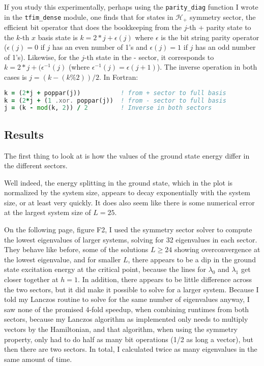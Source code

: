 \documentclass{article}
\begin{document}
If you study this experimentally, perhaps using the {\tt parity\_diag} function
I wrote in the {\tt tfim\_dense} module, one finds that for states in $\mathcal H_+$
symmetry sector, the efficient bit operator that does the bookkeeping from the $j$-th
+ parity state to the $k$-th $x$ basis state is $k = 2*j + \epsilon(j)$ where $\epsilon$
is the bit string parity operator ($\epsilon(j) = 0$ if $j$ has an even number of 1's
and $\epsilon(j) = 1$ if $j$ has an odd number of 1's).
Likewise, for the $j$-th state in the - sector, it corresponds to $k = 2*j + (\epsilon^{-1}(j)$
(where $\epsilon^{-1}(j) = \epsilon(j+1)$).
The inverse operation in both cases is $j = (k - (k \% 2)) / 2$.
In Fortran:
\begin{lstlisting}[language=Fortran]
k = (2*j + poppar(j))           ! from + sector to full basis
k = (2*j + (1 .xor. poppar(j))  ! from - sector to full basis
j = (k - mod(k, 2)) / 2         ! Inverse in both sectors
\end{lstlisting}

\subsection{
Results
}

The first thing to look at is how the values of the ground
state energy differ in the different sectors.

{\centering



}

Well indeed, the energy splitting in the ground state,
which in the plot is normalized by the system size,
appears to decay exponentially
with the system size, or at least very quickly.
It does also seem like there is some numerical error at the largest system size of 
$L=25$.

On the following page, figure F2,
I used the symmetry sector solver to compute the lowest eigenvalues
of larger systems, solving for 32 eigenvalues in each sector.
They behave like before, some of the solutions $L\geq 24$ showing overconvergence
at the lowest eigenvalue, and for smaller $L$, there appears to
be a dip in the ground state excitation energy at the 
critical point, because the lines for $\lambda_0$ and $\lambda_1$
get closer together at $h=1$.
In addition, there appears to be little difference across the two sectors,
but it did make it possible to solve for a larger system.
Because I told my Lanczos routine to solve for the same number
of eigenvalues anyway, I saw none of the promised 4-fold speedup,
when combining runtimes from both sectors, because my Lanczos algorithm
as implemented only needs to multiply vectors by the Hamiltonian,
and that algorithm, when using the symmetry property, only had to do half as many
bit operations (1/2 as long a vector), but then there are two sectors.
In total, I calculated twice as many eigenvalues in the same amount of time.
\end{document}
